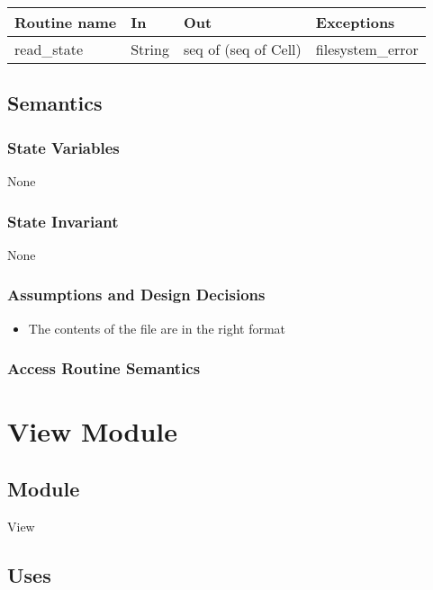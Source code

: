 \documentclass[12pt]{article}
\begin{document}
\begin{tabular}{| l | l | l | p{5cm} |}
\hline
\textbf{Routine name} & \textbf{In} & \textbf{Out} & \textbf{Exceptions}\\
\hline
read\_state & String & seq of (seq of Cell) & filesystem\_error\\
\hline
\end{tabular}

\subsection* {Semantics}

\subsubsection* {State Variables}

None

\subsubsection* {State Invariant}

None

\subsubsection* {Assumptions and Design Decisions}

\begin{itemize}
    \item The contents of the file are in the right format
\end{itemize}

\subsubsection* {Access Routine Semantics}

\newpage

\section* {View Module}

\subsection*{Module}

View

\subsection* {Uses}
\end{document}
